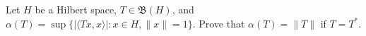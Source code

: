 Let $H$ be a Hilbert space, $T \in \mathfrak{B}(H)$, and $\alpha(T) = \sup\{|\langle Tx, x \rangle| : x \in H, \|x\| = 1\}$. Prove that $\alpha(T) = \|T\|$ if $T = T^*$.
